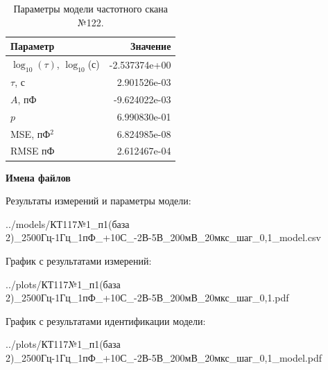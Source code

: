 \begin{table}[!ht]
    \centering
    \caption{Параметры модели частотного скана №122.}
    \begin{tabular}{|l|r|}
        \hline
        Параметр                                       & Значение                  \\ \hline
        $\log_{10}(\tau)$, $\log_{10}$(с)              & -2.537374e+00             \\ \hline
        $\tau$, с                                      & 2.901526e-03              \\ \hline
        $A$, пФ                                        & -9.624022e-03             \\ \hline
        $p$                                            & 6.990830e-01              \\ \hline
        MSE, пФ$^2$                                    & 6.824985e-08              \\ \hline
        RMSE пФ                                        & 2.612467e-04              \\ \hline
    \end{tabular}
    \label{table:frequency_scan_model_122}
\end{table}

\textbf{Имена файлов}

Результаты измерений и параметры модели:

\scriptsize../models/КТ117№1\_п1(база 2)\_2500Гц-1Гц\_1пФ\_+10С\_-2В-5В\_200мВ\_20мкс\_шаг\_0,1\_model.csv
\normalsize

График с результатами измерений:

\scriptsize../plots/КТ117№1\_п1(база 2)\_2500Гц-1Гц\_1пФ\_+10С\_-2В-5В\_200мВ\_20мкс\_шаг\_0,1.pdf
\normalsize

График с результатами идентификации модели:

\scriptsize../plots/КТ117№1\_п1(база 2)\_2500Гц-1Гц\_1пФ\_+10С\_-2В-5В\_200мВ\_20мкс\_шаг\_0,1\_model.pdf
\normalsize


